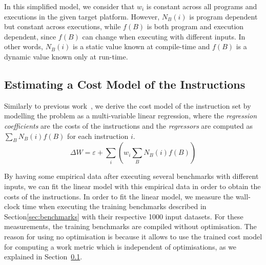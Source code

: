 In this simplified model, we consider that $w_i$ is constant across all programs and executions in the given target platform.
However, $N_B(i)$ is program dependent but constant across executions, while $f(B)$ is both program and execution dependent, since $f(B)$ can change when executing with different inputs.
In other words, $N_B(i)$ is a static value known at compile-time and $f(B)$ is a dynamic value known only at run-time.

%

\subsection{Estimating a Cost Model of the Instructions}

Similarly to previous work~\citep{giusto01,powell09,brandolese11}, we derive the cost model of the instruction set by modelling the problem as a multi-variable linear regression, where the \textit{regression coefficients} are the costs of the instructions and the \textit{regressors} are computed as $\sum_B N_B(i)f(B)$ for each instruction $i$.
\[
\Delta W = \varepsilon + \sum_{i} \left(w_i \sum_{B} N_B(i)f(B)\right)
\]

By having some empirical data after executing several benchmarks with different inputs, we can fit the linear model with this empirical data in order to obtain the costs of the instructions.
In order to fit the linear model, we measure the wall-clock time when executing the training benchmarks described in Section\ref{sec:benchmarks} with their respective 1000 input datasets.
For these measurements, the training benchmarks are compiled without optimisation.
The reason for using no optimisation is because it allows to use the trained cost model for computing a work metric which is independent of optimisations, as we explained in Section~\ref{}.

